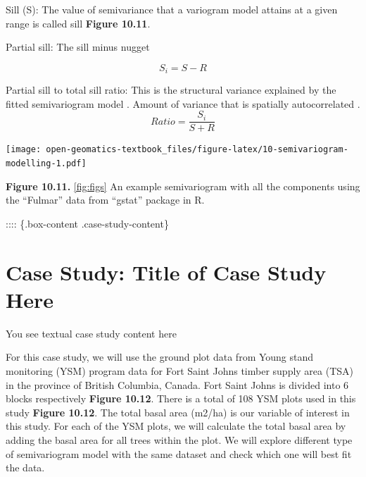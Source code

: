 \documentclass[
]{book}
\begin{document}
Sill (S): The value of semivariance that a variogram model attains at a given range is called sill \textbf{Figure 10.11}.

Partial sill: The sill minus nugget

\[S_{i}= S-R\]

Partial sill to total sill ratio: This is the structural variance explained by the fitted semivariogram model \citep{Rossi1992}. Amount of variance that is spatially autocorrelated \citep{Rossi1992}.
\[ Ratio =\frac {S_{i}}{S+R}\]

\texttt{[image: open-geomatics-textbook\_files/figure-latex/10-semivariogram-modelling-1.pdf]}

\textbf{Figure 10.11.} \ref{fig:figs} An example semivariogram with all the components using the ``Fulmar'' \citep[see details][]{Pebesma2005} data from ``gstat'' package in R.

:::: \{.box-content .case-study-content\}

\hypertarget{case-study-title-of-case-study-here-3}{%
\section{Case Study: Title of Case Study Here}\label{case-study-title-of-case-study-here-3}}

You see textual case study content here

For this case study, we will use the ground plot data from Young stand monitoring (YSM) program data \citep{ProvinceofBC2018} for Fort Saint Johns timber supply area (TSA) in the province of British Columbia, Canada. Fort Saint Johns is divided into 6 blocks respectively \textbf{Figure 10.12}. There is a total of 108 YSM plots used in this study \textbf{Figure 10.12}. The total basal area (m2/ha) is our variable of interest in this study. For each of the YSM plots, we will calculate the total basal area by adding the basal area for all trees within the plot. We will explore different type of semivariogram model with the same dataset and check which one will best fit the data.
\end{document}
